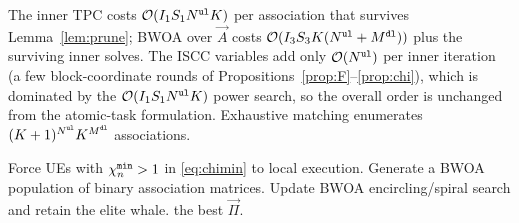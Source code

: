 \documentclass[journal]{IEEEtran}
\begin{document}
The inner TPC costs $\mathcal{O}(I_1 S_1 N^{\tt ul}K)$ per association that survives Lemma~\ref{lem:prune}; BWOA over $\vec{A}$ costs $\mathcal{O}(I_3 S_3 K(N^{\tt ul}+M^{\tt dl}))$ plus the surviving inner solves. The ISCC variables add only $\mathcal{O}(N^{\tt ul})$ per inner iteration (a few block-coordinate rounds of Propositions~\ref{prop:F}--\ref{prop:chi}), which is dominated by the $\mathcal{O}(I_1 S_1 N^{\tt ul}K)$ power search, so the overall order is unchanged from the atomic-task formulation. Exhaustive matching enumerates $(K+1)^{N^{\tt ul}}K^{M^{\tt dl}}$ associations.

\begin{algorithm}[!t]
\DontPrintSemicolon
{}
Force UEs with $\chi_n^{\tt min}>1$ in \eqref{eq:chimin} to local execution.\;
Generate a BWOA population of binary association matrices.\;
Update BWOA encircling/spiral search and retain the elite whale.\;
\Return the best $\vec{\Pi}$.\;
\caption{Hybrid WOA/IWOA/PSO--BWOA for SI-TNTN UAV edge-inference ISCC.}
\label{alg:hyb}
\end{algorithm}
\end{document}
